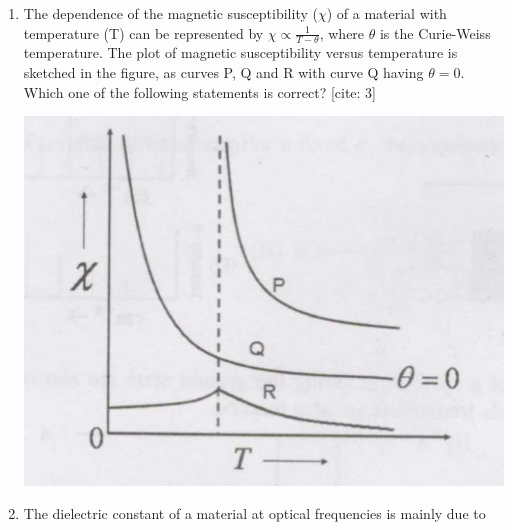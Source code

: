 \documentclass[14pt, a4paper]{extarticle}
\begin{document}
\begin{enumerate}[label=\textbf{Q. \arabic*}, start=21]
\item The dependence of the magnetic susceptibility ($\chi$) of a material with temperature (T) can be represented by $\chi \propto \frac{1}{T-\theta}$, where $\theta$ is the Curie-Weiss temperature. The plot of magnetic susceptibility versus temperature is sketched in the figure, as curves P, Q and R with curve Q having $\theta=0$. Which one of the following statements is correct? [cite: 3]
    \begin{center}
        \includegraphics[width=0.5\columnwidth]{figs/Q27figs.png}
    \end{center}
    \begin{enumerate}[label=(\Alph*)]
    \end{enumerate}

\item The dielectric constant of a material at optical frequencies is mainly due to
\begin{enumerate}[label=(\Alph*)]
\end{enumerate}


\end{enumerate}
\end{document}
